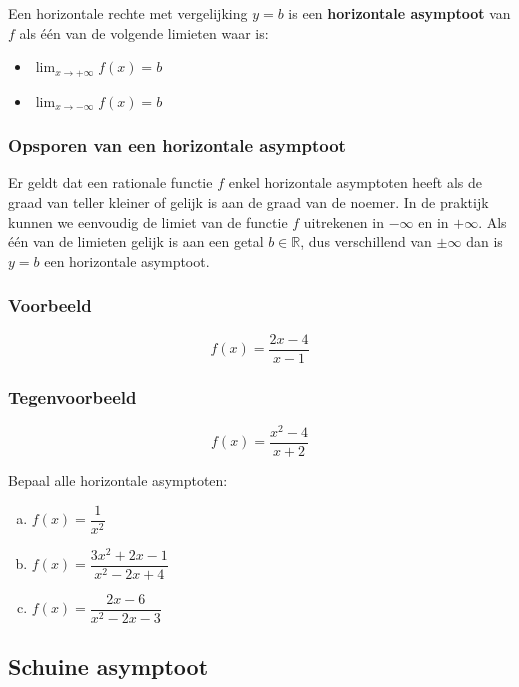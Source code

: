 \documentclass[12pt,twoside,a4paper]{article}
\newenvironment{definitie}
{
  \vspace{0.4cm}
  \begin{mdframed}[nobreak=true,frametitle={Definitie}]
  }{%
  \end{mdframed}
}
\begin{document}
\begin{definitie}
Een horizontale rechte met vergelijking $y=b$ is een {\bf horizontale asymptoot} van $f$ als één van de volgende limieten waar is:
\begin{multicols}{2}
\begin{itemize}
  \item $\lim_{x\to+\infty} f(x)=b$
  \item $\lim_{x\to-\infty} f(x)=b$
\end{itemize}
\end{multicols}
\end{definitie}

\subsubsection*{Opsporen van een horizontale asymptoot}

Er geldt dat een rationale functie $f$ enkel horizontale asymptoten heeft als de graad van teller kleiner of gelijk is aan de graad van de noemer. In de praktijk kunnen we eenvoudig de limiet van de functie $f$ uitrekenen in $-\infty$ en in $+\infty$. Als één van de limieten gelijk is aan een getal $b\in\mathbb{R}$, dus verschillend van $\pm\infty$ dan is $y=b$ een horizontale asymptoot.

\subsubsection*{Voorbeeld}
$$f(x)=\dfrac{2x-4}{x-1}$$

\subsubsection*{Tegenvoorbeeld}
$$f(x)=\dfrac{x^2-4}{x+2}$$

\begin{oefening}
Bepaal alle horizontale asymptoten:
\begin{enumerate}[(a)]
  \itemsep.5em
  \item $f(x)=\dfrac{1}{x^2}$
  \item $f(x)=\dfrac{3x^2+2x-1}{x^2-2x+4}$
  \item $f(x)=\dfrac{2x-6}{x^2-2x-3}$
\end{enumerate}
\end{oefening}

\subsection{Schuine asymptoot}
\end{document}
